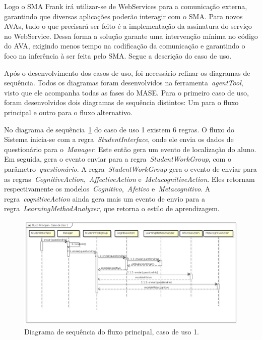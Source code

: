 Logo o SMA Frank irá utilizar-se de WebServices para a comunicação externa, garantindo que diversas aplicações poderão interagir com o SMA. Para novos AVAs, tudo o que precisará ser feito é a implementação da assinatura do serviço no WebService. Dessa forma a solução garante uma intervenção mínima no código do AVA, exigindo menos tempo na codificação da comunicação e garantindo o foco na inferência à ser feita pelo SMA. Segue a descrição do caso de uso.

Após o desenvolvimento dos casos de uso, foi necessário refinar os diagramas de sequência. Todos os diagramas foram desenvolvidos na ferramenta~\emph{agentTool}, visto que ele acompanha todas as fases do MASE. Para o primeiro caso de uso, foram desenvolvidos dois diagramas de sequência distintos: Um para o fluxo principal e outro para o fluxo alternativo.

No diagrama de sequência~\ref{fig:dss-uc1-fluxo-principal} do caso de uso 1 existem 6 regras. O fluxo do Sistema inicia-se com a regra~\emph{StudentInterface}, onde ele envia os dados de questionário para o~\emph{Manager}. Este então gera um evento de localização do aluno. Em seguida, gera o evento enviar para a regra~\emph{StudentWorkGroup}, com o parâmetro~\emph{questionário}. A regra~\emph{StudentWorkGroup} gera o evento de enviar para as regras~\emph{CognitiveAction},~\emph{AffectiveAction} e~\emph{MetacognitiveAction}. Eles retornam respectivamente os modelos~\emph{Cognitivo},~\emph{Afetivo} e~\emph{Metacognitivo}. A regra~\emph{cognitiveAction} ainda gera mais um evento de envio para a regra~\emph{LearningMethodAnalyzer}, que retorna o estilo de aprendizagem.

\begin{figure}
	\centering
	\includegraphics[scale=0.42]{images/dss-uc1-fluxo-principal.png}
	\caption{Diagrama de sequência do fluxo principal, caso de uso 1.}
	\label{fig:dss-uc1-fluxo-principal}
\end{figure}

